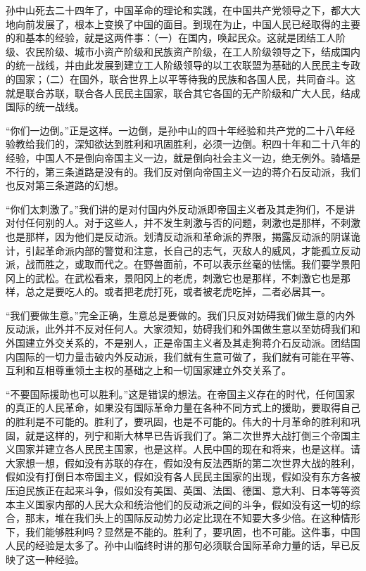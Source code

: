 孙中山死去二十四年了，中国革命的理论和实践，在中国共产党领导之下，都大大地向前发展了，根本上变换了中国的面目。到现在为止，中国人民已经取得的主要的和基本的经验，就是这两件事：（一）在国内，唤起民众。这就是团结工人阶级、农民阶级、城市小资产阶级和民族资产阶级，在工人阶级领导之下，结成国内的统一战线，并由此发展到建立工人阶级领导的以工农联盟为基础的人民民主专政的国家；（二）在国外，联合世界上以平等待我的民族和各国人民，共同奋斗。这就是联合苏联，联合各人民民主国家，联合其它各国的无产阶级和广大人民，结成国际的统一战线。

“你们一边倒。”正是这样。一边倒，是孙中山的四十年经验和共产党的二十八年经验教给我们的，深知欲达到胜利和巩固胜利，必须一边倒。积四十年和二十八年的经验，中国人不是倒向帝国主义一边，就是倒向社会主义一边，绝无例外。骑墙是不行的，第三条道路是没有的。我们反对倒向帝国主义一边的蒋介石反动派，我们也反对第三条道路的幻想。

“你们太刺激了。”我们讲的是对付国内外反动派即帝国主义者及其走狗们，不是讲对付任何别的人。对于这些人，并不发生刺激与否的问题，刺激也是那样，不刺激也是那样，因为他们是反动派。划清反动派和革命派的界限，揭露反动派的阴谋诡计，引起革命派内部的警觉和注意，长自己的志气，灭敌人的威风，才能孤立反动派，战而胜之，或取而代之。在野兽面前，不可以表示丝毫的怯懦。我们要学景阳冈上的武松。在武松看来，景阳冈上的老虎，刺激它也是那样，不刺激它也是那样，总之是要吃人的。或者把老虎打死，或者被老虎吃掉，二者必居其一。

“我们要做生意。”完全正确，生意总是要做的。我们只反对妨碍我们做生意的内外反动派，此外并不反对任何人。大家须知，妨碍我们和外国做生意以至妨碍我们和外国建立外交关系的，不是别人，正是帝国主义者及其走狗蒋介石反动派。团结国内国际的一切力量击破内外反动派，我们就有生意可做了，我们就有可能在平等、互利和互相尊重领土主权的基础之上和一切国家建立外交关系了。

“不要国际援助也可以胜利。”这是错误的想法。在帝国主义存在的时代，任何国家的真正的人民革命，如果没有国际革命力量在各种不同方式上的援助，要取得自己的胜利是不可能的。胜利了，要巩固，也是不可能的。伟大的十月革命的胜利和巩固，就是这样的，列宁和斯大林早已告诉我们了。第二次世界大战打倒三个帝国主义国家并建立各人民民主国家，也是这样。人民中国的现在和将来，也是这样。请大家想一想，假如没有苏联的存在，假如没有反法西斯的第二次世界大战的胜利，假如没有打倒日本帝国主义，假如没有各人民民主国家的出现，假如没有东方各被压迫民族正在起来斗争，假如没有美国、英国、法国、德国、意大利、日本等等资本主义国家内部的人民大众和统治他们的反动派之间的斗争，假如没有这一切的综合，那末，堆在我们头上的国际反动势力必定比现在不知要大多少倍。在这种情形下，我们能够胜利吗？显然是不能的。胜利了，要巩固，也不可能。这件事，中国人民的经验是太多了。孙中山临终时讲的那句必须联合国际革命力量的话，早已反映了这一种经验。

